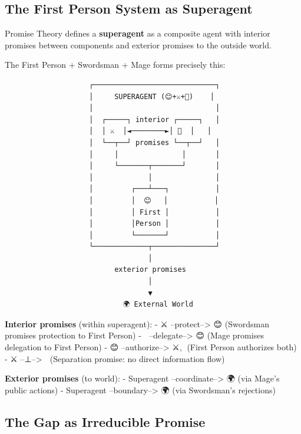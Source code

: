 \documentclass[
]{article}
\begin{document}
\subsection{The First Person System as
Superagent}\label{the-first-person-system-as-superagent}

Promise Theory defines a \textbf{superagent} as a composite agent with
interior promises between components and exterior promises to the
outside world.

The First Person + Swordsman + Mage forms precisely this:

\begin{verbatim}
                    ┌─────────────────────────────┐
                    │     SUPERAGENT (😊+⚔️+🧙)    │
                    │                             │
                    │  ┌─────┐ interior ┌─────┐   │
                    │  │ ⚔️  │◄────────►│ 🧙  │   │
                    │  └──┬──┘ promises └──┬──┘   │
                    │     │               │       │
                    │     └───────┬───────┘       │
                    │             │               │
                    │         ┌───┴───┐           │
                    │         │  😊   │           │
                    │         │ First │           │
                    │         │Person │           │
                    │         └───────┘           │
                    └─────────────┬───────────────┘
                                  │
                          exterior promises
                                  │
                                  ▼
                            🌍 External World
\end{verbatim}

\textbf{Interior promises} (within superagent): - ⚔️
--protect--\textgreater{} 😊 (Swordsman promises protection to First
Person) - 🧙 --delegate--\textgreater{} 😊 (Mage promises delegation to
First Person) - 😊 --authorize--\textgreater{} ⚔️,🧙 (First Person
authorizes both) - ⚔️ --⊥--\textgreater{} 🧙 (Separation promise: no
direct information flow)

\textbf{Exterior promises} (to world): - Superagent
--coordinate--\textgreater{} 🌍 (via Mage's public actions) - Superagent
--boundary--\textgreater{} 🌍 (via Swordsman's rejections)

\subsection{The Gap as Irreducible
Promise}\label{the-gap-as-irreducible-promise}
\end{document}
